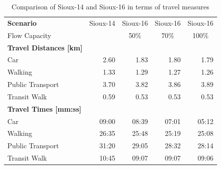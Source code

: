 \begin{table}[]
\centering
\caption{Comparison of Sioux-14 and Sioux-16 in terms of travel measures }
\label{tab:sioux}
\begin{tabular}{@{}lrrrr@{}}
\toprule
\textbf{Scenario}                  & \multicolumn{1}{c}{Sioux-14} & \multicolumn{1}{c}{Sioux-16} & \multicolumn{1}{c}{Sioux-16} & \multicolumn{1}{c}{Sioux-16} \\
Flow Capacity                      & \multicolumn{1}{c}{}         & \multicolumn{1}{c}{50\%}     & \multicolumn{1}{c}{70\%}     & \multicolumn{1}{c}{100\%}    \\ \midrule
\textbf{Travel Distances {[}km{]}} & \multicolumn{1}{l}{}         & \multicolumn{1}{l}{}         & \multicolumn{1}{l}{}         & \multicolumn{1}{l}{}         \\
Car                                & 2.60                         & 1.83                         & 1.80                         & 1.79                         \\
Walking                            & 1.33                         & 1.29                         & 1.27                         & 1.26                         \\
Public Transport                   & 3.70                         & 3.82                         & 3.86                         & 3.89                         \\
Transit Walk                       & 0.59                         & 0.53                         & 0.53                         & 0.53                         \\\midrule
\textbf{Travel Times {[}mm:ss{]}}  & \multicolumn{1}{l}{}         & \multicolumn{1}{l}{}         & \multicolumn{1}{l}{}         & \multicolumn{1}{l}{}         \\
Car                                & 09:00                        & 08:39                        & 07:01                        & 05:12                        \\
Walking                            & 26:35                        & 25:48                        & 25:19                        & 25:08                        \\
Public Transport                   & 31:20                        & 29:05                        & 28:32                        & 28:14                        \\
Transit Walk                       & 10:45                        & 09:07                        & 09:07                        & 09:06                        \\\midrule

\end{tabular}
\end{table}

